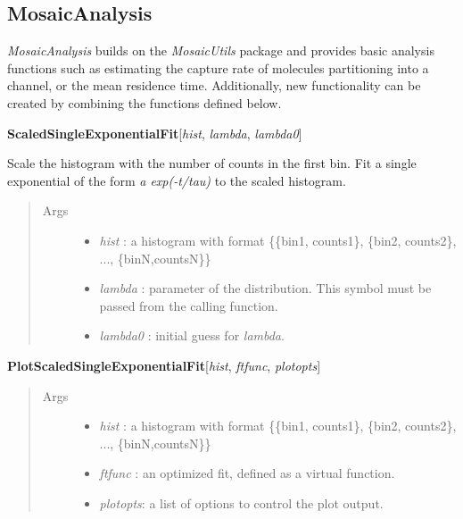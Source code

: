 \documentclass[letterpaper,10pt,english]{sphinxmanual}
\begin{document}
\subsection{MosaicAnalysis}
\label{doc/Addons:mosaicanalysis}\label{doc/Addons:mathematica-mosaicanalysis-sec}
\emph{MosaicAnalysis} builds on the \emph{MosaicUtils} package and provides basic analysis functions such as estimating the capture rate of molecules partitioning into a channel, or the mean residence time. Additionally, new functionality can be created by combining the functions defined below.

\textbf{ScaledSingleExponentialFit}{[}\emph{hist}, \emph{lambda}, \emph{lambda0}{]}

Scale the histogram with the number of counts in the first bin. Fit a single exponential of the form \emph{a exp(-t/tau)} to the scaled histogram.
\begin{quote}\begin{description}
\item[{Args}] \leavevmode\begin{itemize}
\item {} 
\emph{hist}        : a histogram with format \{\{bin1, counts1\}, \{bin2, counts2\}, ..., \{binN,countsN\}\}

\item {} 
\emph{lambda}      : parameter of the distribution. This symbol must be passed from the calling function.

\item {} 
\emph{lambda0}     : initial guess for \emph{lambda}.

\end{itemize}

\end{description}\end{quote}

\textbf{PlotScaledSingleExponentialFit}{[}\emph{hist}, \emph{ftfunc}, \emph{plotopts}{]}
\begin{quote}\begin{description}
\item[{Args}] \leavevmode\begin{itemize}
\item {} 
\emph{hist}        : a histogram with format \{\{bin1, counts1\}, \{bin2, counts2\}, ..., \{binN,countsN\}\}

\item {} 
\emph{ftfunc}      : an optimized fit, defined as a virtual function.

\item {} 
\emph{plotopts}: a list of options to control the plot output.

\end{itemize}

\end{description}\end{quote}
\end{document}
